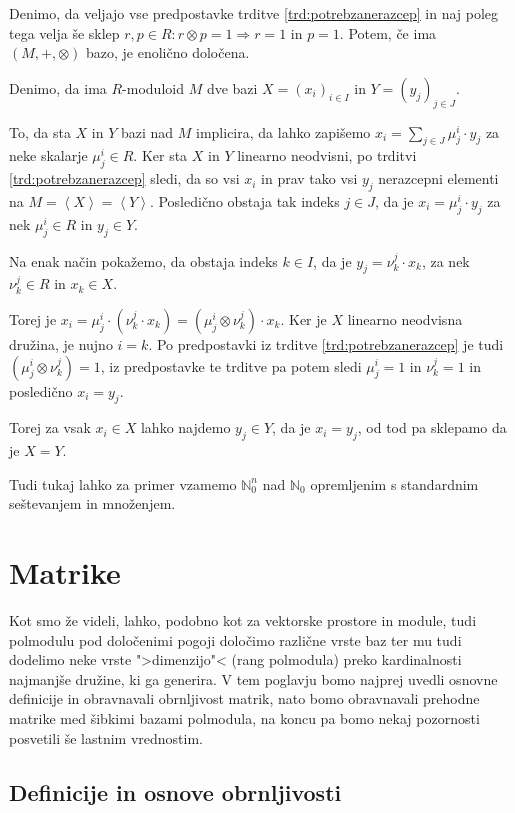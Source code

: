 \documentclass[mat1]{fmfdelo}
\newcommand{\N}{\mathbb{N}}
\newcommand{\No}{\N_0}
\newcommand{\Gen}[1]{\ensuremath{\left<{#1}\right>}}
\begin{document}
\begin{trditev}
	\label{trd:enoličbaza}
	Denimo, da veljajo vse predpostavke trditve \ref{trd:potrebzanerazcep} in naj poleg tega velja še sklep $r, p\in R: r\otimes p = 1\Rightarrow r = 1$ in $p = 1$. Potem, če ima $(M, +, \otimes)$ bazo, je enolično določena.
\end{trditev}

\begin{dokaz}
	Denimo, da ima $R$-moduloid $M$ dve bazi $X=(x_i)_{i\in I}$ in $Y=(y_j)_{j \in J}$. 
	
	To, da sta $X$ in $Y$ bazi nad $M$ implicira, da lahko zapišemo $x_i = \sum_{j\in J}\mu_j^i\cdot y_j$ za neke skalarje $\mu_j^i \in R$.
	Ker sta $X$ in $Y$ linearno neodvisni, po trditvi \ref{trd:potrebzanerazcep} sledi, da so vsi $x_i$ in prav tako vsi $y_j$ nerazcepni elementi na $M = \Gen{X} = \Gen{Y}$. Posledično obstaja tak indeks $j\in J$, da je $x_i = \mu_j^i \cdot y_j$ za nek $\mu_j^i \in R$ in $y_j\in Y$.
	
	Na enak način pokažemo, da obstaja indeks $k\in I$, da je $y_j = \nu_k^j \cdot x_k$, za nek $\nu_k^j \in R$ in $x_k \in X$.

	Torej je $x_i = \mu_j^i \cdot (\nu_k^j \cdot x_k) = (\mu_j^i \otimes \nu_k^j) \cdot x_k$. Ker je $X$ linearno neodvisna družina, je nujno $i = k$. Po predpostavki iz trditve \ref{trd:potrebzanerazcep} je tudi $(\mu_j^i \otimes \nu_k^j) = 1$, iz predpostavke te trditve pa potem sledi $\mu_j^i = 1$ in $\nu_k^j = 1$ in posledično $x_i = y_j$.
	
	Torej za vsak $x_i\in X$ lahko najdemo $y_j\in Y$, da je $x_i = y_j$, od tod pa sklepamo da je $X = Y$.
\end{dokaz}
Tudi tukaj lahko za primer vzamemo $\No^n$ nad $\No$ opremljenim s standardnim seštevanjem in množenjem.
\section{Matrike}
Kot smo že videli, lahko, podobno kot za vektorske prostore in module, tudi polmodulu pod določenimi pogoji določimo različne vrste baz ter mu tudi dodelimo neke vrste ">dimenzijo"< (rang polmodula) preko kardinalnosti najmanjše družine, ki ga generira. V tem poglavju bomo najprej uvedli osnovne definicije in obravnavali obrnljivost matrik, nato bomo obravnavali prehodne matrike med šibkimi bazami polmodula, na koncu pa bomo nekaj pozornosti posvetili še lastnim vrednostim.

\subsection{Definicije in osnove obrnljivosti}\label{subsect:definv}
\end{document}
